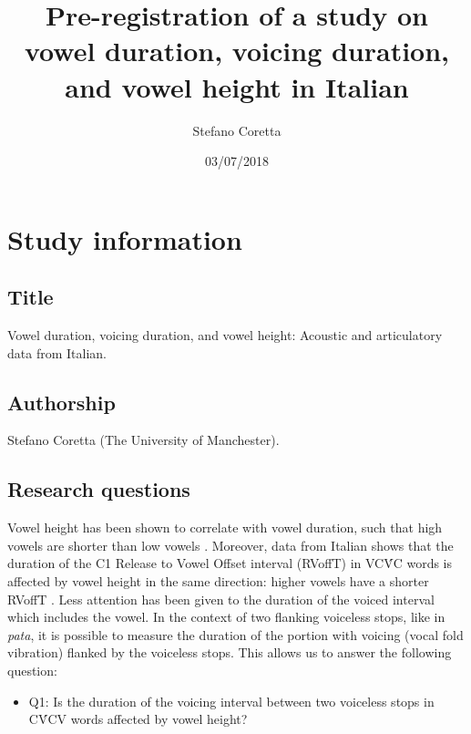 \documentclass[11pt,]{article}
\title{Pre-registration of a study on vowel duration, voicing duration, and
vowel height in Italian}
\author{Stefano Coretta}
\date{03/07/2018}
\providecommand{\tightlist}{%
  \setlength{\itemsep}{0pt}\setlength{\parskip}{0pt}}
\begin{document}
\maketitle

\hypertarget{study-information}{%
\section{Study information}\label{study-information}}

\hypertarget{title}{%
\subsection{Title}\label{title}}

Vowel duration, voicing duration, and vowel height: Acoustic and
articulatory data from Italian.

\hypertarget{authorship}{%
\subsection{Authorship}\label{authorship}}

Stefano Coretta (The University of Manchester).

\hypertarget{research-questions}{%
\subsection{Research questions}\label{research-questions}}

Vowel height has been shown to correlate with vowel duration, such that
high vowels are shorter than low vowels \citep[see][ and
\citet{esposito2002} and references therein]{toivonen2015}. Moreover,
data from Italian shows that the duration of the C1 Release to Vowel
Offset interval (RVoffT) in VCV́C words is affected by vowel height in
the same direction: higher vowels have a shorter RVoffT
\citep{esposito2002}. Less attention has been given to the duration of
the voiced interval which includes the vowel. In the context of two
flanking voiceless stops, like in \emph{pata}, it is possible to measure
the duration of the portion with voicing (vocal fold vibration) flanked
by the voiceless stops. This allows us to answer the following question:

\begin{itemize}
\tightlist
\item
  Q1: Is the duration of the voicing interval between two voiceless
  stops in CV́CV words affected by vowel height?
\end{itemize}
\end{document}
